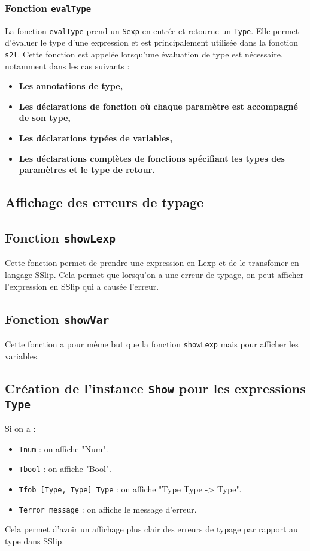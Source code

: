 \documentclass{article}
\begin{document}
\subsubsection{Fonction \texttt{evalType}}
La fonction \texttt{evalType} prend un \texttt{Sexp} en entrée et retourne un \texttt{Type}. Elle permet d'évaluer le type d'une expression et est principalement utilisée dans la fonction \texttt{s2l}. Cette fonction est appelée lorsqu'une évaluation de type est nécessaire, notamment dans les cas suivants : 
\begin{itemize}
\item \textbf{Les annotations de type,}
\item \textbf{Les déclarations de fonction où chaque paramètre est accompagné de son type,}
\item \textbf{Les déclarations typées de variables,}
\item \textbf{Les déclarations complètes de fonctions spécifiant les types des paramètres et le type de retour.}
\end{itemize}

\subsection{Affichage des erreurs de typage}
\subsection{Fonction \texttt{showLexp}}
Cette fonction permet de prendre une expression en Lexp et de le transfomer
en langage SSlip. Cela permet que lorsqu'on a une erreur de typage, on peut afficher
l'expression en SSlip qui a causée l'erreur.

\subsection{Fonction \texttt{showVar}}
Cette fonction a pour même but que la fonction \texttt{showLexp} mais pour
afficher les variables.

\subsection{Création de l'instance \texttt{Show} pour les expressions \texttt{Type}}
Si on a :
\begin{itemize}
   \item \texttt{Tnum} : on affiche "Num".
   \item \texttt{Tbool} : on affiche "Bool".
   \item \texttt{Tfob [Type, Type] Type} : on affiche "Type Type -> Type".
   \item \texttt{Terror message} : on affiche le message d'erreur.
\end{itemize}
Cela permet d'avoir un affichage plus clair des erreurs de typage par rapport 
au type dans SSlip. 
\end{document}
